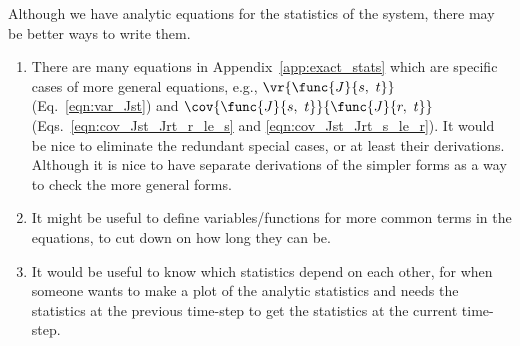 Although we have analytic equations for the statistics of the system, there may be better ways to write them.

\begin{enumerate}[\textbf{SE}--1)]
	\item There are many equations in Appendix~\ref{app:exact_stats} which are specific cases of more general equations, e.g., $\vr{\func{J}{s,\ t}}$ (Eq.~\ref{eqn:var_Jst}) and $\cov{\func{J}{s,\ t}}{\func{J}{r,\ t}}$ (Eqs.~\ref{eqn:cov_Jst_Jrt_r_le_s} and \ref{eqn:cov_Jst_Jrt_s_le_r}). It would be nice to eliminate the redundant special cases, or at least their derivations. Although it is nice to have separate derivations of the simpler forms as a way to check the more general forms.
	\item It might be useful to define variables/functions for more common terms in the equations, to cut down on how long they can be.
	\item It would be useful to know which statistics depend on each other, for when someone wants to make a plot of the analytic statistics and needs the statistics at the previous time-step to get the statistics at the current time-step.
\end{enumerate}
